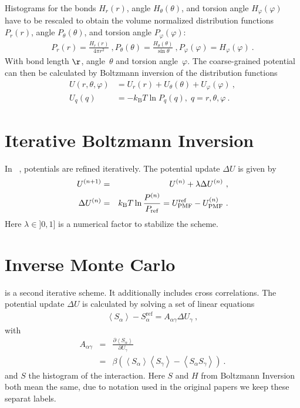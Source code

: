 Histograms for the bonds $H_r(r)$, angle $H_\theta(\theta)$, and torsion angle $H_\varphi(\varphi)$ have to be rescaled to obtain the volume normalized distribution functions $P_r(r)$, angle $P_\theta(\theta)$, and torsion angle $P_\varphi(\varphi)$: 
%
\begin{align}
    P_r(r) = \frac{H_r(r)}{4\pi r^2}~,
    P_\theta(\theta) = \frac{H_\theta(\theta)}{\sin \theta}~,
    P_\varphi(\varphi) = H_\varphi (\varphi)~.
    \label{eq:boltzmann_norm}
\end{align}
With bond length $\r$, angle~$\theta$ and torsion angle~$\varphi$.%
The coarse-grained potential can then be calculated by Boltzmann inversion of the distribution functions
%
\begin{align}
    \label{eq:boltzmann_pmf}
    U({r}, \theta, \varphi) &= U_r({r}) + U_{\theta}(\theta) + U_{\varphi}(\varphi)~, \\
    U_q({q}) &= - k_\text{B} T \ln P_q( q ),\; q=r, \theta, \varphi~.
    \nonumber
\end{align}


\section{Iterative Boltzmann Inversion}
\label{sec:ibi}

In \ibi~\cite{Reith:2003}, potentials are refined iteratively. The potential update $\Delta U$ is given by
\begin{eqnarray}
  \label{eq:iter_boltzmann}
  U^{(n+1)} &=& U^{(n)} + \lambda \Delta U^{(n)}~, \\
  \Delta U^{(n)} &=&  k_\text{B} T \ln  \frac{P^{(n)}}{P_{\rm ref}}
  =  U_\text{PMF}^\text{ref} - U_\text{PMF}^{(n)}~.
\end{eqnarray}
Here $\lambda \in ]0,1]$ is a numerical factor to stabilize the scheme.

\section{Inverse Monte Carlo}
\label{sec:imc}

\imc is a second iterative scheme. It additionally includes cross correlations. The potential update $\Delta U$ is calculated by solving a set of linear equations
\begin{align}
    \left<S_{\alpha}\right> - S_{\alpha}^{\text{ref}}= A_{\alpha \gamma} \Delta U_{\gamma}~,
  \label{eq:imc}
\end{align}
%
with
\begin{eqnarray}
  \label{eq:covariance}
  A_{\alpha \gamma} &=& \frac{\partial \left< S_{\alpha} \right> }{\partial U_{\gamma}}  \\
  \nonumber
  &=&
  \beta \left( \left<S_{\alpha} \right>\left<S_{\gamma} \right> - \left<S_{\alpha} S_{\gamma} \right>  \right)~.
  \nonumber
\end{eqnarray}
and $S$ the histogram of the interaction. Here $S$ and $H$ from Boltzmann Inversion both mean the same, due to notation used in the original papers we keep these separat labels.

